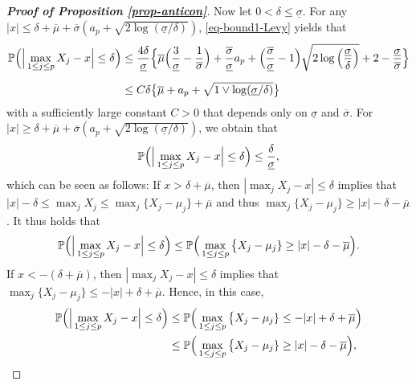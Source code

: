 \documentclass[a4paper,12pt]{article}
\numberwithin{equation}{section}
\begin{document}
\begin{proof}[\textnormal{\textbf{Proof of Proposition \ref{prop-anticon}}}]
Now let $0 < \delta \le \underline{\sigma}$. For any $|x| \le \delta + \overline{\mu} + \overline{\sigma}(a_p + \sqrt{2\log(\underline{\sigma}/\delta)})$, \eqref{eq-bound1-Levy} yields that 
\begin{align}
\mathbb{P} \Big( \Big| \max_{1 \le j \le p} X_j - x \Big| \le \delta \Big) 
 & \le \frac{4 \delta}{\underline{\sigma}} \Big\{ \overline{\mu} \Big( \frac{3}{\underline{\sigma}} - \frac{1}{\overline{\sigma}} \Big) + \frac{\overline{\sigma}}{\underline{\sigma}} a_p + \Big( \frac{\overline{\sigma}}{\underline{\sigma}} - 1 \Big) \sqrt{2\log\Big(\frac{\underline{\sigma}}{\delta}\Big)} + 2 - \frac{\underline{\sigma}}{\overline{\sigma}} \Big\} \nonumber \\[0.2cm]
 & \le C \delta \big\{ \overline{\mu} + a_p + \sqrt{1 \vee \log(\underline{\sigma}/\delta)} \big\} \label{eq-bound2-Levy}
\end{align}
with a sufficiently large constant $C > 0$ that depends only on $\underline{\sigma}$ and $\overline{\sigma}$. For \linebreak  $|x| \ge \delta + \overline{\mu} + \overline{\sigma}(a_p + \sqrt{2\log(\underline{\sigma}/\delta)})$, we obtain that 
\begin{equation}\label{eq-bound3-Levy}
\mathbb{P} \Big( \Big| \max_{1 \le j \le p} X_j - x \Big| \le \delta \Big) \le \frac{\delta}{\underline{\sigma}}, 
\end{equation}
which can be seen as follows: If $x > \delta + \overline{\mu}$, then $|\max_j X_j - x| \le \delta$ implies that $|x| - \delta \le \max_j X_j \le \max_j \{ X_j - \mu_j \} + \overline{\mu}$ and thus $\max_j \{ X_j - \mu_j \} \ge |x| - \delta - \overline{\mu}$. It thus holds that 
\begin{equation}\label{eq-bound3-Levy-prep1}
\mathbb{P} \Big( \Big| \max_{1 \le j \le p} X_j - x \Big| \le \delta \Big) \le \mathbb{P} \Big( \max_{1 \le j \le p} \big\{ X_j - \mu_j \} \ge |x| - \delta - \overline{\mu} \Big). 
\end{equation}
If $x < - (\delta + \overline{\mu})$, then $|\max_j X_j - x| \le \delta$ implies that $\max_j \{ X_j - \mu_j \} \le -|x| + \delta + \overline{\mu}$. Hence, in this case,
\begin{align}
\pr \Big( \Big| \max_{1 \le j \le p} X_j - x \Big| \le \delta \Big) 
 & \le \pr \Big( \max_{1 \le j \le p} \big\{ X_j - \mu_j \} \le -|x| + \delta + \overline{\mu} \Big) \nonumber \\
 & \le \pr \Big( \max_{1 \le j \le p} \big\{ X_j - \mu_j \} \ge |x| - \delta - \overline{\mu} \Big), \label{eq-bound3-Levy-prep2}

\end{align}
\end{proof}
\end{document}
